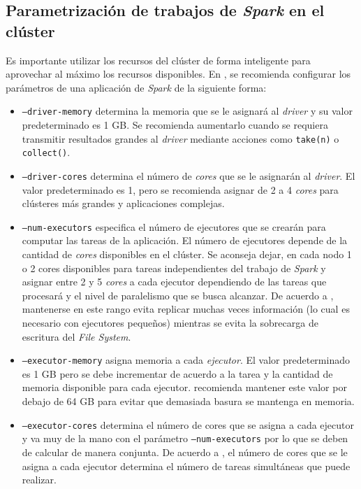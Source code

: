 \subsection{Parametrización de trabajos de \textit{Spark} en el clúster}
\label{section:parametrizacion_de_trabajos_spark}

Es importante utilizar los recursos del clúster de forma inteligente para aprovechar al máximo los recursos disponibles. En \cite{sparkconfuds}, se recomienda configurar los parámetros de una aplicación de \textit{Spark} de la siguiente forma:

\begin{itemize}
	\item \texttt{--driver-memory} determina la memoria que se le asignará al \textit{driver} y su valor predeterminado es 1 GB. Se recomienda aumentarlo cuando se requiera transmitir resultados grandes al \textit{driver} mediante acciones como \texttt{take(n)} o \texttt{collect()}.
	\item \texttt{--driver-cores} determina el número de \textit{cores} que se le asignarán al \textit{driver}. El valor predeterminado es 1, pero se recomienda asignar de 2 a 4 \textit{cores} para clústeres más grandes y aplicaciones complejas. 
	\item \texttt{--num-executors} especifica el número de ejecutores que se crearán para computar las tareas de la aplicación. El número de ejecutores depende de la cantidad de \textit{cores} disponibles en el clúster. Se aconseja dejar, en cada nodo 1 o 2 cores disponibles para tareas independientes del trabajo de \textit{Spark} y asignar entre 2 y 5 \textit{cores} a cada ejecutor dependiendo de las tareas que procesará y el nivel de paralelismo que se busca alcanzar. De acuerdo a \cite{sparkconfcloudera}, mantenerse en este rango evita replicar muchas veces información (lo cual es necesario con ejecutores pequeños) mientras se evita la sobrecarga de escritura del \textit{File System}.
	\item \texttt{--executor-memory} asigna memoria a cada \textit{ejecutor}. El valor predeterminado es 1 GB pero se debe incrementar de acuerdo a la tarea y la cantidad de memoria disponible para cada ejecutor. \cite{sparkconfcloudera} recomienda mantener este valor por debajo de 64 GB para evitar que demasiada basura se mantenga en memoria.
	\item \texttt{--executor-cores} determina el número de cores que se asigna a cada ejecutor y va muy de la mano con el parámetro \texttt{--num-executors} por lo que se deben de calcular de manera conjunta. De acuerdo a \cite{sparkconfcloudera}, el número de cores que se le asigna a cada ejecutor determina el número de tareas simultáneas que puede realizar.
\end{itemize}

